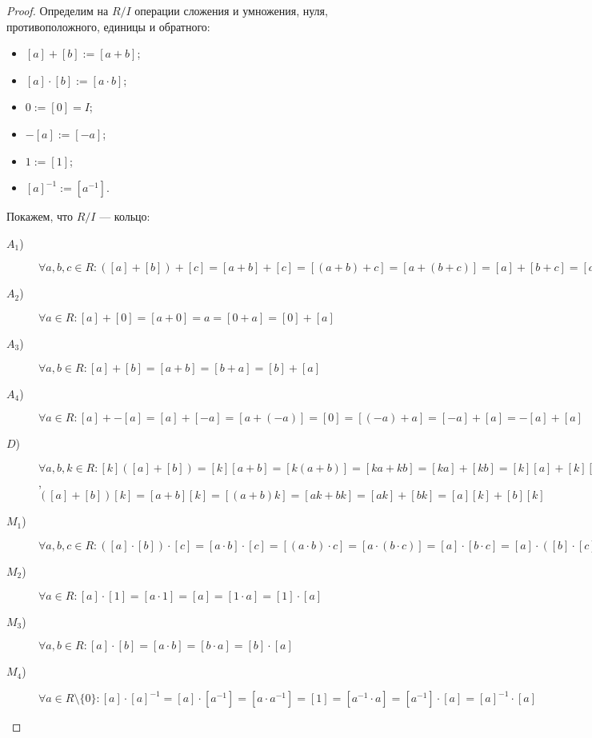 \documentclass[12pt,a4paper]{article}
\begin{document}
\begin{proof}
        Определим на $R/I$ операции сложения и умножения, нуля, противоположного, единицы и обратного:
        \begin{itemize}
            \item $[a] + [b] := [a + b]$;
            \item $[a] \cdot [b] := [a \cdot b]$;
            \item $0 := [0] = I$;
            \item $-[a] := [-a]$;
            \item $1 := [1]$;
            \item $[a]^{-1} := [a^{-1}]$.
        \end{itemize}
        Покажем, что $R/I$ --- кольцо:
        \begin{description}
            \item[$A_1$)] $\forall a, b, c \in R: ([a] + [b]) + [c] = [a + b] + [c] = [(a + b) + c] = [a + (b + c)] = [a] + [b + c] = [a] + ([b] + [c])$
            \item[$A_2$)] $\forall a \in R: [a] + [0] = [a + 0] = a = [0 + a] = [0] + [a]$
            \item[$A_3$)] $\forall a, b \in R: [a] + [b] = [a + b] = [b + a] = [b] + [a]$
            \item[$A_4$)] $\forall a \in R: [a] + -[a] = [a] + [-a] = [a + (-a)] = [0] = [(-a) + a] = [-a] + [a] = -[a] + [a]$
            \item[$D$)] $\forall a, b, k \in R: [k]([a] + [b]) = [k][a + b] = [k(a + b)] = [ka + kb] = [ka] + [kb] = [k][a] + [k][b]$, $([a] + [b])[k] = [a + b][k] = [(a + b)k] = [ak + bk] = [ak] + [bk] = [a][k] + [b][k]$
            \item[$M_1$)] $\forall a, b, c \in R: ([a] \cdot [b]) \cdot [c] = [a \cdot b] \cdot [c] = [(a \cdot b) \cdot c] = [a \cdot (b \cdot c)] = [a] \cdot [b \cdot c] = [a] \cdot ([b] \cdot [c])$
            \item[$M_2$)] $\forall a \in R: [a] \cdot [1] = [a \cdot 1] = [a] = [1 \cdot a] = [1] \cdot [a]$
            \item[$M_3$)] $\forall a, b \in R: [a] \cdot [b] = [a \cdot b] = [b \cdot a] = [b] \cdot [a]$
            \item[$M_4$)] $\forall a \in R \setminus \{0\}: [a] \cdot [a]^{-1} = [a] \cdot [a^{-1}] = [a \cdot a^{-1}] = [1] = [a^{-1} \cdot a] = [a^{-1}] \cdot [a] = [a]^{-1} \cdot [a]$
        \end{description}
    \end{proof}
\end{document}
